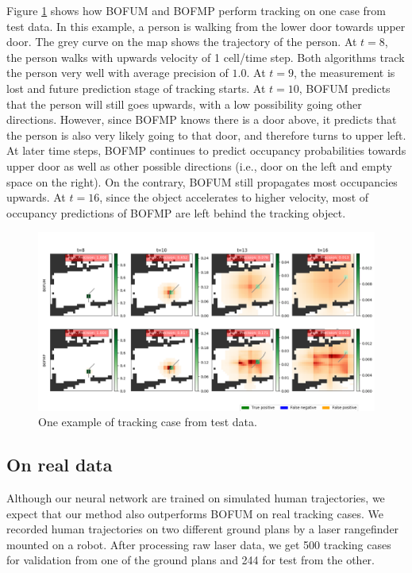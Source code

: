 Figure \ref{fig:tracking_simulated_data} shows how BOFUM and BOFMP perform tracking on one case from test data. In this example, a person is walking from the lower door towards upper door. The grey curve on the map shows the trajectory of the person. At $t=8$, the person walks with upwards velocity of 1 cell/time step. Both algorithms track the person very well with average precision of $1.0$. At $t=9$, the measurement is lost and future prediction stage of tracking starts. At $t=10$, BOFUM predicts that the person will still goes upwards, with a low possibility going other directions. However, since BOFMP knows there is a door above, it predicts that the person is also very likely going to that door, and therefore turns to upper left. At later time steps, BOFMP continues to predict occupancy probabilities towards upper door as well as other possible directions (i.e., door on the left and empty space on the right). On the contrary, BOFUM still propagates most occupancies upwards. At $t=16$, since the object accelerates to higher velocity, most of occupancy predictions of BOFMP are left behind the tracking object.
\begin{figure}[ht]
  \centering
   \captionsetup{width=\linewidth}
    \includegraphics[width=\textwidth]{figures/tracking_sample_for_simulated_data.png}
    \caption{One example of tracking case from test data.}
    \label{fig:tracking_simulated_data}
\end{figure}

\subsection{On real data}

Although our neural network are trained on simulated human trajectories, we expect that our method also outperforms BOFUM on real tracking cases. We recorded human trajectories on two different ground plans by a laser rangefinder mounted on a robot. After processing raw laser data, we get 500 tracking cases for validation from one of the ground plans and 244 for test from the other. 



